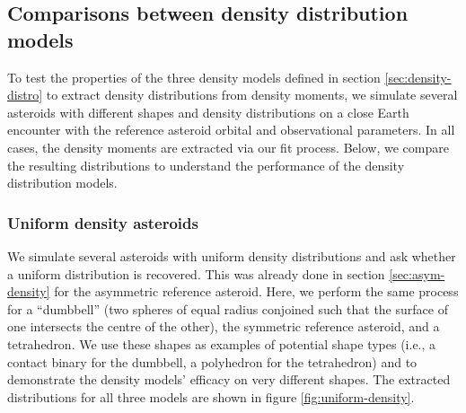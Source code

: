 \documentclass[fleqn,usenatbib]{mnras}
\begin{document}
\subsection{Comparisons between density distribution models}
\label{sec:density-compare}

To test the properties of the three density models defined in section \ref{sec:density-distro} to extract density distributions from density moments, we simulate several asteroids with different shapes and density distributions on a close Earth encounter with the reference asteroid orbital and observational parameters. In all cases, the density moments are extracted via our fit process. Below, we compare the resulting distributions to understand the performance of the density distribution models.

\subsubsection{Uniform density asteroids}

We simulate several asteroids with uniform density distributions and ask whether a uniform distribution is recovered. This was already done in section \ref{sec:asym-density} for the asymmetric reference asteroid. Here, we perform the same process for a ``dumbbell'' (two spheres of equal radius conjoined such that the surface of one intersects the centre of the other), the symmetric reference asteroid, and a tetrahedron. We use these shapes as examples of potential shape types (i.e., a contact binary for the dumbbell, a polyhedron for the tetrahedron) and to demonstrate the density models' efficacy on very different shapes. The extracted distributions for all three models are shown in figure \ref{fig:uniform-density}. 
\end{document}
